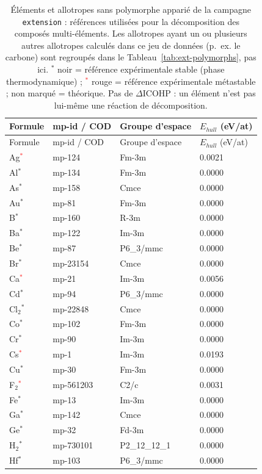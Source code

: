 \begin{longtable}{@{}llll@{}}
\caption{Éléments et allotropes sans polymorphe apparié de la campagne \texttt{extension} : références utilisées pour la décomposition des composés multi-éléments. Les allotropes ayant un ou plusieurs autres allotropes calculés dans ce jeu de données (p.~ex. le carbone) sont regroupés dans le Tableau~\ref{tab:ext-polymorphs}, pas ici. $^*$ noir = référence expérimentale stable (phase thermodynamique) ; \textcolor{red}{$^*$} rouge = référence expérimentale métastable ; non marqué = théorique. Pas de $\Delta$ICOHP : un élément n'est pas lui-même une réaction de décomposition.}\\
\toprule
Formule & mp-id / COD & Groupe d'espace & $E_{hull}$ (eV/at) \\
\midrule
\endfirsthead
\toprule
Formule & mp-id / COD & Groupe d'espace & $E_{hull}$ (eV/at) \\
\midrule
\endhead
\bottomrule
\endfoot
Ag\textcolor{red}{$^*$} & mp-124 & Fm-3m & 0.0021 \\
Al$^*$ & mp-134 & Fm-3m & 0.0000 \\
As$^*$ & mp-158 & Cmce & 0.0000 \\
Au$^*$ & mp-81 & Fm-3m & 0.0000 \\
B$^*$ & mp-160 & R-3m & 0.0000 \\
Ba$^*$ & mp-122 & Im-3m & 0.0000 \\
Be$^*$ & mp-87 & P6\_3/mmc & 0.0000 \\
Br$^*$ & mp-23154 & Cmce & 0.0000 \\
Ca\textcolor{red}{$^*$} & mp-21 & Im-3m & 0.0056 \\
Cd$^*$ & mp-94 & P6\_3/mmc & 0.0000 \\
Cl$_{2}$$^*$ & mp-22848 & Cmce & 0.0000 \\
Co$^*$ & mp-102 & Fm-3m & 0.0000 \\
Cr$^*$ & mp-90 & Im-3m & 0.0000 \\
Cs\textcolor{red}{$^*$} & mp-1 & Im-3m & 0.0193 \\
Cu$^*$ & mp-30 & Fm-3m & 0.0000 \\
F$_{2}$\textcolor{red}{$^*$} & mp-561203 & C2/c & 0.0031 \\
Fe$^*$ & mp-13 & Im-3m & 0.0000 \\
Ga$^*$ & mp-142 & Cmce & 0.0000 \\
Ge$^*$ & mp-32 & Fd-3m & 0.0000 \\
H$_{2}$$^*$ & mp-730101 & P2\_12\_12\_1 & 0.0000 \\
Hf$^*$ & mp-103 & P6\_3/mmc & 0.0000 \\

\end{longtable}

